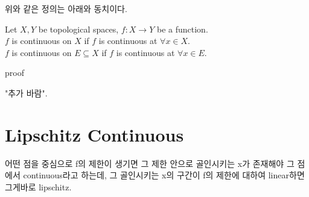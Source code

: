 \documentclass[11pt]{article}
\renewcommand{\(}{\left(}
\renewcommand{\)}{\right)}
\renewcommand{\[}{\left[}
\renewcommand{\]}{\right]}
\newenvironment{text-box}{}{}
\newcommand{\subheading}[1]{#1}
\begin{document}
위와 같은 정의는 아래와 동치이다. \\
\begin{text-box}
    Let $X, Y$ be topological spaces, $f: X \to Y$ be a function. \\
    $f$ is continuous on $X$ if $f$ is continuous at $\forall x \in X$. \\
    $f$ is continuous on $E \subseteq X$ if $f$ is continuous at $\forall x \in E$.
\end{text-box}

\subheading{proof}

"추가 바람".

\section{Lipschitz Continuous}

어떤 점을 중심으로 f의 제한이 생기면 그 제한 안으로 골인시키는 x가 존재해야 그 점에서 continuous라고 하는데, 
그 골인시키는 x의 구간이 f의 제한에 대하여 linear하면 그게바로 lipschitz.
\end{document}
